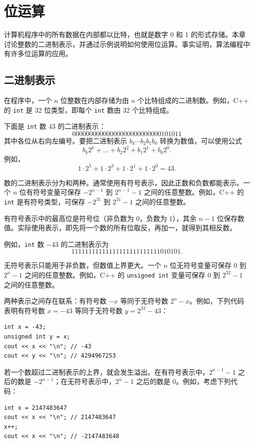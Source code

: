 \chapter{位运算}

计算机程序中的所有数据在内部都以比特，也就是数字 0 和 1 的形式存储。本章讨论整数的二进制表示，并通过示例说明如何使用位运算。事实证明，算法编程中有许多位运算的应用。

\section{二进制表示}


在程序中，一个 $n$ 位整数在内部存储为由 $n$ 个比特组成的二进制数。例如，C++ 的 \texttt{int} 是 32 位类型，即每个 \texttt{int} 数由 32 个比特组成。

下面是 \texttt{int} 数 43 的二进制表示：
\[00000000000000000000000000101011\]
其中各位从右向左编号。要把二进制表示 $b_k\cdots b_2b_1b_0$ 转换为数值，可以使用公式
\[b_k 2^k + \ldots + b_2 2^2 + b_1 2^1 + b_0 2^0.\]
例如，
\[1 \cdot 2^5 + 1 \cdot 2^3 + 1 \cdot 2^1 + 1 \cdot 2^0 = 43.\]

数的二进制表示分为和两种。通常使用有符号表示，因此正数和负数都能表示。一个 $n$ 位有符号变量可保存 $-2^{n-1}$ 到 $2^{n-1}-1$ 之间的任意整数。例如，C++ 的 \texttt{int} 是有符号类型，可保存 $-2^{31}$ 到 $2^{31}-1$ 之间的任意整数。

有符号表示中的最高位是符号位（非负数为 0，负数为 1），其余 $n-1$ 位保存数值。实际使用表示，即先将一个数的所有位取反，再加一，就得到其相反数。

例如，\texttt{int} 数 $-43$ 的二进制表示为
\[11111111111111111111111111010101.\]

无符号表示只能用于非负数，但数值上界更大。一个 $n$ 位无符号变量可保存 $0$ 到 $2^n-1$ 之间的任意整数。例如，C++ 的 \texttt{unsigned int} 变量可保存 $0$ 到 $2^{32}-1$ 之间的任意整数。

两种表示之间存在联系：有符号数 $-x$ 等同于无符号数 $2^n-x$。例如，下列代码表明有符号数 $x=-43$ 等同于无符号数 $y=2^{32}-43$：
\begin{lstlisting}
int x = -43;
unsigned int y = x;
cout << x << "\n"; // -43
cout << y << "\n"; // 4294967253
\end{lstlisting}

若一个数超过二进制表示的上界，就会发生溢出。在有符号表示中，$2^{n-1}-1$ 之后的数是 $-2^{n-1}$；在无符号表示中，$2^n-1$ 之后的数是 0。例如，考虑下列代码：
\begin{lstlisting}
int x = 2147483647
cout << x << "\n"; // 2147483647
x++;
cout << x << "\n"; // -2147483648
\end{lstlisting}

